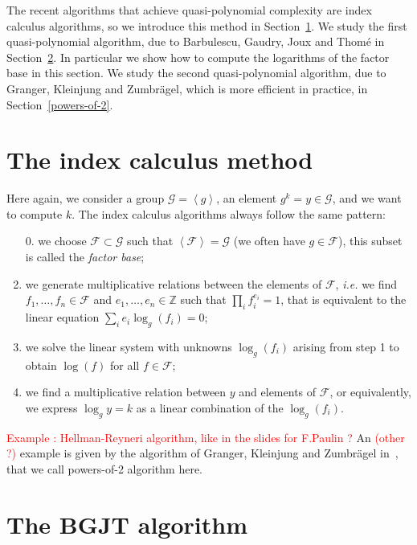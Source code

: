 \documentclass[a4paper,11pt]{article}
\theoremstyle{break}
\theoremstyle{sc}
\theoremstyle{definition}
\theoremstyle{remark}
\newcommand{\ie}{\emph{i.e. }}
\begin{document}
The recent algorithms that achieve quasi-polynomial complexity are index
calculus algorithms, so we introduce this method in
Section~\ref{index-calculus}. We study the first quasi-polynomial algorithm, due to
Barbulescu, Gaudry, Joux and Thomé in Section~\ref{bgjt}. In particular we show
how to compute the logarithms of the factor base in this section. We study the
second quasi-polynomial algorithm, due to Granger, Kleinjung and Zumbrägel,
which is more efficient in practice, in Section~\ref{powers-of-2}.

\section{The index calculus method}
\label{index-calculus}

Here again, we consider a group $\mathcal G=\left\langle g \right\rangle$, an element
$g^k = y\in \mathcal G$, and we want to compute $k$. The index calculus algorithms always
follow the same pattern:
\begin{enumerate}
  \item[0.] we choose $\mathcal F\subset \mathcal G$ such that $\left\langle
    \mathcal F \right\rangle = \mathcal G$
    (we often have $g\in \mathcal F$), this subset is called the \emph{factor base};
  \item we generate multiplicative relations between the elements of $\mathcal F$, \ie we
    find $f_1, \dots, f_n \in \mathcal F$ and $e_1, \dots, e_n\in \mathbb{Z}$ such that
    $\prod_i f_i^{e_i} = 1$, that is equivalent to the linear equation $\sum_i
    e_i\log_g(f_i) = 0$;
  \item we solve the linear system with unknowns $\log_g(f_i)$ arising from step
    1 to obtain $\log(f)$ for all $f\in \mathcal F$;
  \item we find a multiplicative relation between $y$ and elements of $\mathcal F$, or
    equivalently, we express $\log_g y = k$ as a linear combination of the
  $\log_g(f_i)$.
\end{enumerate}
\textcolor{red}{Example : Hellman-Reyneri algorithm, like in the slides for
  F.Paulin ?}
  \newline
  \newline
  An \textcolor{red}{(other ?)} example is given by the algorithm of Granger,
  Kleinjung and Zumbrägel in~\cite{GKZ14}, that we call powers-of-2 algorithm here.
  \section{The BGJT algorithm}
  \label{bgjt}
\end{document}
